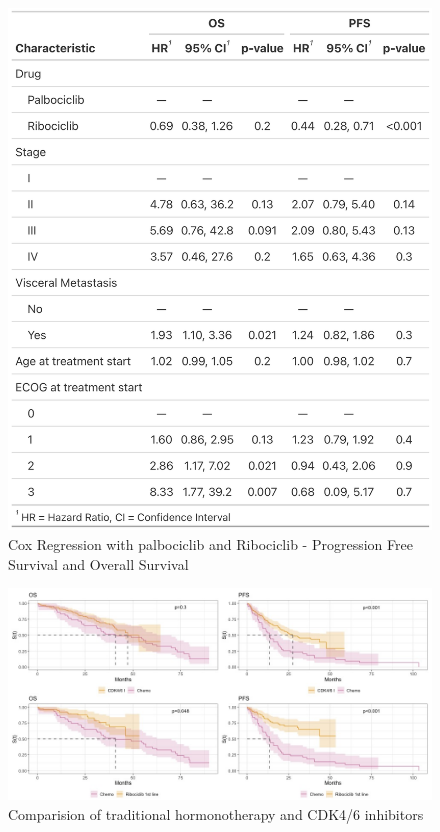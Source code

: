 \begin{figure}[ht]
  \centering
  \caption{Cox Regression with palbociclib and Ribociclib - Progression Free Survival and Overall Survival}\label{fig:cox} 
  \includegraphics[scale=0.25]{figures/cox_both.png}%

\end{figure}

\begin{figure}[ht]
  \centering

  \caption{Comparision of traditional hormonotherapy and CDK4/6 inhibitors  }\label{fig:grouped} 
  \includegraphics[scale=0.4]{figures/grouped_curve_both.jpeg}%

\end{figure}

